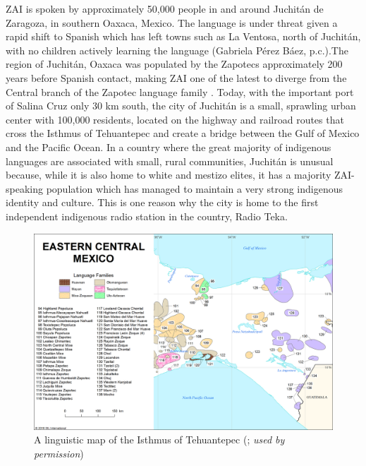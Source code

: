 ZAI is spoken by approximately 50,000 people in and around Juchit\'{a}n de Zaragoza, in southern Oaxaca, Mexico. The language is under threat given a rapid shift to Spanish which has left towns such as La Ventosa, north of Juchit\'{a}n, with no children actively learning the language (Gabriela P\'{e}rez B\'{a}ez, p.c.).The region of Juchit\'{a}n, Oaxaca was populated by the Zapotecs approximately 200 years before Spanish contact, making ZAI one of the latest to diverge from the Central branch of the Zapotec language family \citep{rendon1995}. Today, with the important port of Salina Cruz only 30 km south, the city of Juchit\'{a}n is a small, sprawling urban center with 100,000 residents, located on the highway and railroad routes that cross the Isthmus of Tehuantepec and create a bridge between the Gulf of Mexico and the Pacific Ocean. In a country where the great majority of indigenous languages are associated with small, rural communities, Juchit\'{a}n is unusual because, while it is also home to white and mestizo elites, it has a majority ZAI-speaking population which has managed to maintain a very strong indigenous identity and culture. This is one reason why the city is home to the first independent indigenous radio station in the country, Radio Teka. 




\begin{figure}
\includegraphics[height=.4\textheight]{mapa3.png}
\caption{\small{A linguistic map of the Isthmus of Tehuantepec (\cite{lewis2016}; \textit{used by permission})}}
\end{figure}


